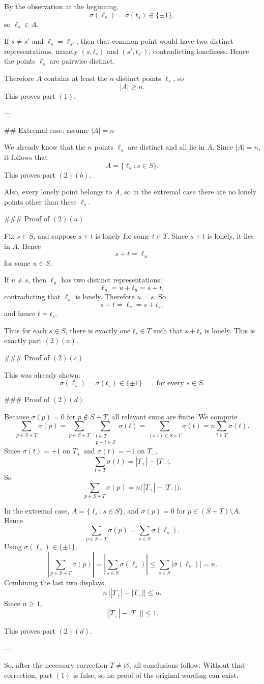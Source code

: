 By the observation at the beginning,
\[
\sigma(\ell_s)=\sigma(t_s)\in\{\pm1\},
\]
so \(\ell_s\in A\).

If \(s\neq s'\) and \(\ell_s=\ell_{s'}\), then that common point would have two distinct representations, namely \((s,t_s)\) and \((s',t_{s'})\), contradicting loneliness. Hence the points \(\ell_s\) are pairwise distinct.

Therefore \(A\) contains at least the \(n\) distinct points \(\ell_s\), so
\[
|A|\ge n.
\]
This proves part \((1)\).

---

## Extremal case: assume \(|A|=n\)

We already know that the \(n\) points \(\ell_s\) are distinct and all lie in \(A\). Since \(|A|=n\), it follows that
\[
A=\{\ell_s:s\in S\}.
\]
This proves part \((2)(b)\).

Also, every lonely point belongs to \(A\), so in the extremal case there are no lonely points other than these \(\ell_s\).

### Proof of \((2)(a)\)

Fix \(s\in S\), and suppose \(s+t\) is lonely for some \(t\in T\). Since \(s+t\) is lonely, it lies in \(A\). Hence
\[
s+t=\ell_u
\]
for some \(u\in S\).

If \(u\neq s\), then \(\ell_u\) has two distinct representations:
\[
\ell_u=u+t_u=s+t,
\]
contradicting that \(\ell_u\) is lonely. Therefore \(u=s\). So
\[
s+t=\ell_s=s+t_s,
\]
and hence \(t=t_s\).

Thus for each \(s\in S\), there is exactly one \(t_s\in T\) such that \(s+t_s\) is lonely. This is exactly part \((2)(a)\).

### Proof of \((2)(c)\)

This was already shown:
\[
\sigma(\ell_s)=\sigma(t_s)\in\{\pm1\}
\qquad\text{for every }s\in S.
\]

### Proof of \((2)(d)\)

Because \(\sigma(p)=0\) for \(p\notin S+T\), all relevant sums are finite. We compute
\[
\sum_{p\in S+T}\sigma(p)
=
\sum_{p\in S+T}\ \sum_{\substack{t\in T\\ p-t\in S}}\sigma(t)
=
\sum_{(s,t)\in S\times T}\sigma(t)
=
n\sum_{t\in T}\sigma(t).
\]
Since \(\sigma(t)=+1\) on \(T_+\) and \(\sigma(t)=-1\) on \(T_-\),
\[
\sum_{t\in T}\sigma(t)=|T_+|-|T_-|.
\]
So
\[
\sum_{p\in S+T}\sigma(p)=n\bigl(|T_+|-|T_-|\bigr).
\]

In the extremal case, \(A=\{\ell_s:s\in S\}\), and \(\sigma(p)=0\) for \(p\in (S+T)\setminus A\). Hence
\[
\sum_{p\in S+T}\sigma(p)=\sum_{s\in S}\sigma(\ell_s).
\]
Using \(\sigma(\ell_s)\in\{\pm1\}\),
\[
\left|\sum_{p\in S+T}\sigma(p)\right|
=
\left|\sum_{s\in S}\sigma(\ell_s)\right|
\le
\sum_{s\in S}|\sigma(\ell_s)|
=
n.
\]
Combining the last two displays,
\[
n\,\bigl||T_+|-|T_-|\bigr|\le n.
\]
Since \(n\ge 1\),
\[
\bigl||T_+|-|T_-|\bigr|\le 1.
\]

This proves part \((2)(d)\).

---

So, after the necessary correction \(T\neq\varnothing\), all conclusions follow.  
Without that correction, part \((1)\) is false, so no proof of the original wording can exist.